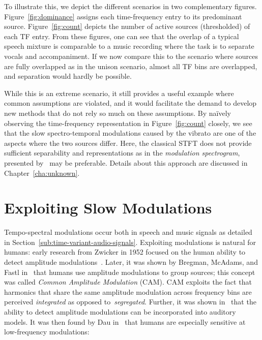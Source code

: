 To illustrate this, we depict the different scenarios in two complementary figures.
Figure~\ref{fig:dominance} assigns each time-frequency entry to its predominant source.
Figure~\ref{fig:count} depicts the number of active sources (thresholded) of each TF entry.
From these figures, one can see that the overlap of a typical speech mixture is comparable to a music recording where the task is to separate vocals and accompaniment.
If we now compare this to the scenario where sources are fully overlapped as in the unison scenario, almost all TF bins are overlapped, and separation would hardly be possible.
\par
While this is an extreme scenario, it still provides a useful example where common assumptions are violated, and it would facilitate the demand to develop new methods that do not rely so much on these assumptions.
By naïvely observing the time-frequency representation in Figure~\ref{fig:count} closely, we see that the slow spectro-temporal modulations caused by the vibrato are one of the aspects where the two sources differ.
Here, the classical \acs{STFT} does not provide sufficient separability and representations as in the \emph{modulation spectrogram}, presented by~\cite{greenberg96} may be preferable.
Details about this approach are discussed in Chapter~\ref{cha:unknown}.

\hypertarget{exploiting-slow-modulations}{%
\section{Exploiting Slow Modulations}\label{exploiting-slow-modulations}}

Tempo-spectral modulations occur both in speech and music signals as detailed in Section~\ref{sub:time-variant-audio-signals}.
Exploiting modulations is natural for humans: early research from Zwicker in 1952 focused on the human ability to detect amplitude modulations~\cite{zwicker52}. 
Later, it was shown by Bregman, McAdams, and Fastl in~\cite{mcadams89, bregman90, fastl90} that humans use amplitude modulations to group sources; this concept was called \emph{Common Amplitude Modulation} (CAM).
CAM exploits the fact that harmonics that share the same amplitude modulation across frequency bins are perceived \emph{integrated} as opposed to~\emph{segregated}.
Further, it was shown in~\cite{bacon89} that the ability to detect amplitude modulations can be incorporated into auditory models.
It was then found by Dau in~\cite{dau99} that humans are especially sensitive at low-frequency modulations:

